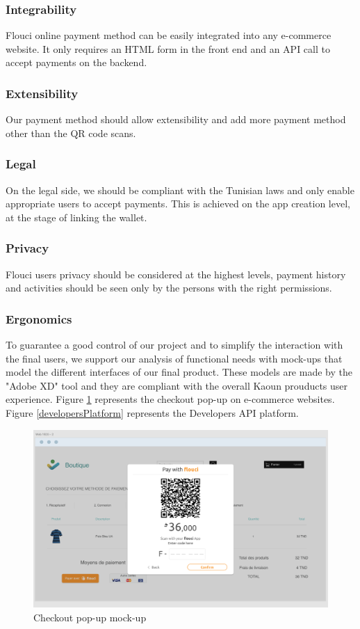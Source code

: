 \begin{spacing}{1.2}
\subsubsection{Integrability}
Flouci online payment method can be easily integrated into any e-commerce website. It only requires an HTML form in the front end and an API call to accept payments on the backend.

\subsubsection{Extensibility}
Our payment method should allow extensibility and add more payment method other than the QR code scans. 
\subsubsection{Legal}
On the legal side, we should be compliant with the Tunisian laws and only enable appropriate users to accept payments.
This is achieved on the app creation level, at the stage of linking the wallet.
\subsubsection{Privacy}
Flouci users privacy should be considered at the highest levels, payment history and activities should be seen only by the persons with the right permissions.
\subsubsection{Ergonomics}
To guarantee a good control of our project and to simplify the interaction with the final users, we support our analysis of functional needs with mock-ups that model the different interfaces of our final product. These models are made by the "Adobe XD" tool and they are compliant with the overall Kaoun prouducts user experience. \newline Figure \ref{checkoutScreen} represents the checkout pop-up on e-commerce websites.
\newline Figure \ref{developersPlatform} represents the Developers API platform.

\begin{figure}[H]\centering
\includegraphics[scale=0.4]{Checkout_screen}
\caption{Checkout pop-up mock-up}
\label{checkoutScreen}
\end{figure}


\end{spacing}
